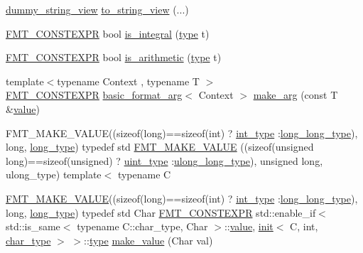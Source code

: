 \begin{DoxyCompactItemize}
\hyperlink{structinternal_1_1dummy__string__view}{dummy\+\_\+string\+\_\+view} \hyperlink{namespaceinternal_a153fda3826e43649ab74f70396f9d5bc}{to\+\_\+string\+\_\+view} (...)
\item 
\hyperlink{core_8h_a69201cb276383873487bf68b4ef8b4cd}{F\+M\+T\+\_\+\+C\+O\+N\+S\+T\+E\+X\+PR} bool \hyperlink{namespaceinternal_a09faa33ade86f8ff4b7eae46cfe148ee}{is\+\_\+integral} (\hyperlink{namespaceinternal_a8661864098ac0acff9a6dd7e66f59038}{type} t)
\item 
\hyperlink{core_8h_a69201cb276383873487bf68b4ef8b4cd}{F\+M\+T\+\_\+\+C\+O\+N\+S\+T\+E\+X\+PR} bool \hyperlink{namespaceinternal_af9461f1217b7ca9b9b78c05e4f998105}{is\+\_\+arithmetic} (\hyperlink{namespaceinternal_a8661864098ac0acff9a6dd7e66f59038}{type} t)
\item 
{\footnotesize template$<$typename Context , typename T $>$ }\\\hyperlink{core_8h_a69201cb276383873487bf68b4ef8b4cd}{F\+M\+T\+\_\+\+C\+O\+N\+S\+T\+E\+X\+PR} \hyperlink{classbasic__format__arg}{basic\+\_\+format\+\_\+arg}$<$ Context $>$ \hyperlink{namespaceinternal_ac3d17a309d86929584064104267b6de4}{make\+\_\+arg} (const T \&\hyperlink{classinternal_1_1value}{value})
\item 
F\+M\+T\+\_\+\+M\+A\+K\+E\+\_\+\+V\+A\+L\+UE((sizeof(long)==sizeof(int) ? \hyperlink{namespaceinternal_a8661864098ac0acff9a6dd7e66f59038a8be38ea7253d1a414964476f31d00064}{int\+\_\+type} \+:\hyperlink{namespaceinternal_a8661864098ac0acff9a6dd7e66f59038af498903f5d22c64c0160c962cbf210e1}{long\+\_\+long\+\_\+type}), long, \hyperlink{namespaceinternal_a0e92ff50bf0626d16bd3c814946ecd3d}{long\+\_\+type}) typedef std \hyperlink{namespaceinternal_abc2b5d27eb4b4952f43ef2c96fa08146}{F\+M\+T\+\_\+\+M\+A\+K\+E\+\_\+\+V\+A\+L\+UE} ((sizeof(unsigned long)==sizeof(unsigned) ? \hyperlink{namespaceinternal_a8661864098ac0acff9a6dd7e66f59038aa2a554d9072770a945ebf5363650f7a1}{uint\+\_\+type} \+:\hyperlink{namespaceinternal_a8661864098ac0acff9a6dd7e66f59038af31bdba5c2a6e81482fa2a1e8b8195f6}{ulong\+\_\+long\+\_\+type}), unsigned long, ulong\+\_\+type) template$<$ typename C
\item 
\hyperlink{namespaceinternal_abc2b5d27eb4b4952f43ef2c96fa08146}{F\+M\+T\+\_\+\+M\+A\+K\+E\+\_\+\+V\+A\+L\+UE}((sizeof(long)==sizeof(int) ? \hyperlink{namespaceinternal_a8661864098ac0acff9a6dd7e66f59038a8be38ea7253d1a414964476f31d00064}{int\+\_\+type} \+:\hyperlink{namespaceinternal_a8661864098ac0acff9a6dd7e66f59038af498903f5d22c64c0160c962cbf210e1}{long\+\_\+long\+\_\+type}), long, \hyperlink{namespaceinternal_a0e92ff50bf0626d16bd3c814946ecd3d}{long\+\_\+type}) typedef std Char \hyperlink{core_8h_a69201cb276383873487bf68b4ef8b4cd}{F\+M\+T\+\_\+\+C\+O\+N\+S\+T\+E\+X\+PR} std\+::enable\+\_\+if$<$ std\+::is\+\_\+same$<$ typename C\+::char\+\_\+type, Char $>$\+::\hyperlink{classinternal_1_1value}{value}, \hyperlink{structinternal_1_1init}{init}$<$ C, int, \hyperlink{namespaceinternal_a8661864098ac0acff9a6dd7e66f59038a57b8984c55996e4117342a9cd2dc313e}{char\+\_\+type} $>$ $>$\+::\hyperlink{namespaceinternal_a8661864098ac0acff9a6dd7e66f59038}{type} \hyperlink{namespaceinternal_a8db45bc77a419c9cb588d3418671c6fd}{make\+\_\+value} (Char val)

\end{DoxyCompactItemize}

